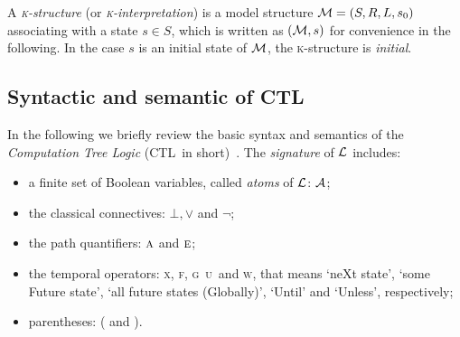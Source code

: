 \documentclass[runningheads]{llncs}
\newcommand{\MPK}{\textsc{k}}
\newcommand{\CTL}{\textrm{CTL}}
\newcommand{\ALL}{\textsc{a}}
\newcommand{\EXIST}{\textsc{e}}
\newcommand{\NEXT}{\textsc{x}}
\newcommand{\FUTURE}{\textsc{f}}
\newcommand{\UNTIL}{\textsc{u}}
\newcommand{\GLOBAL}{\textsc{g}}
\newcommand{\UNLESS}{\textsc{w}}
\begin{document}
A {\em \MPK-structure} (or {\em \MPK-interpretation}) is a model structure
${\cal M}=(S, R, L, s_0)$ associating
with a state $s\in S$, which is written as $({\cal M},s)$ for convenience in the following.
In the case $s$ is an initial state of $\cal M$, the \MPK-structure is {\em initial}.


\subsection{Syntactic and semantic of \CTL}
In the following we briefly review the basic syntax and semantics
of the {\em Computation Tree Logic}
(\CTL\ in short)~\cite{DBLP:journals/toplas/ClarkeES86}. %
%
The {\em signature} of $\cal L$ includes:
\begin{itemize}
  \item a finite set of Boolean variables, called {\em atoms} of $\cal L$: $\cal A$;
  \item the classical connectives: $\bot,\lor$ and $\neg$;
  \item the path quantifiers: $\ALL$ and $\EXIST$;
  \item the temporal operators: \NEXT, \FUTURE, \GLOBAL\, \UNTIL\ and \UNLESS, that
  means `neXt state', `some Future state', `all future states (Globally)', `Until' and `Unless', respectively;
  \item parentheses: ( and ).
\end{itemize}
\end{document}
